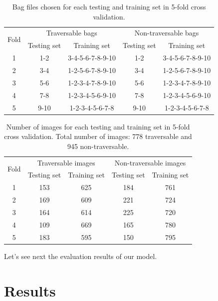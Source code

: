 \documentclass[12pt,a4paper,table,dvipsnames,tikz]{report}
\begin{document}
	\begin{table}[h!]
		\centering
		\begin{tabular}{|c|c|c|c|c|}
			\hline
			\multirow{2}{*}{Fold} & \multicolumn{2}{c|}{Traversable bags} & 
			\multicolumn{2}{c|}{Non-traversable bags}\\
			& Testing set & Training set & Testing set & Training set\\
			\hline\hline
			1 & 1-2 & 3-4-5-6-7-8-9-10 & 1-2 & 3-4-5-6-7-8-9-10\\
			\hline
			2 & 3-4 & 1-2-5-6-7-8-9-10 & 3-4 & 1-2-5-6-7-8-9-10\\
			\hline
			3 & 5-6 & 1-2-3-4-7-8-9-10 & 5-6 & 1-2-3-4-7-8-9-10\\
			\hline
			4 & 7-8 & 1-2-3-4-5-6-9-10 & 7-8 & 1-2-3-4-5-6-9-10\\
			\hline
			5 & 9-10 & 1-2-3-4-5-6-7-8 & 9-10 & 1-2-3-4-5-6-7-8\\
			\hline
		\end{tabular}
		\caption{Bag files chosen for each testing and training set in 5-fold cross validation.}
		\label{table:folds_bags}
	\end{table}
	
	\begin{table}[h!]
		\centering
		\begin{tabular}{|c|c|c|c|c|}
			\hline
			\multirow{2}{*}{Fold} & \multicolumn{2}{c|}{Traversable images} & 
			\multicolumn{2}{c|}{Non-traversable images}\\
			& Testing set & Training set & Testing set & Training set\\
			\hline\hline
			1 & 153 & 625 & 184 & 761\\
			\hline
			2 & 169 & 609 & 221 & 724\\
			\hline
			3 & 164 & 614 & 225 & 720\\
			\hline
			4 & 109 & 669 & 165 & 780\\
			\hline
			5 & 183 & 595 & 150 & 795\\
			\hline
		\end{tabular}
		\caption{Number of images for each testing and training set in 5-fold cross validation. 
			Total number of images: 778 traversable and 945 non-traversable.}
		\label{table:folds_images}
	\end{table}
	
	Let's see next the evaluation results of our model. 
	\\
	
	
	\section{Results}
	\label{sec:exp:res}
	
\end{document}
